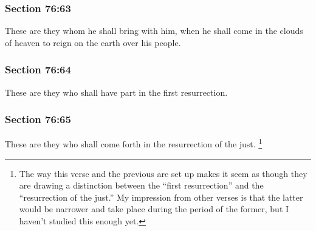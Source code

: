 	\subsubsection{Section 76:63} %
		\label{DC76-63}

		These are they whom he shall bring with him, when he shall come in the clouds of heaven to reign on the earth over his people.


	\subsubsection{Section 76:64} %
		\label{DC76-64}

		These are they who shall have part in the first resurrection.


	\subsubsection{Section 76:65} %
		\label{DC76-65}

		These are they who shall come forth in the resurrection of the just.%
			\footnote{%
				The way this verse and the previous are set up makes it seem as though they are drawing a distinction between the ``first resurrection'' and the ``resurrection of the just.'' My impression from other verses is that the latter would be narrower and take place during the period of the former, but I haven't studied this enough yet.
				}



